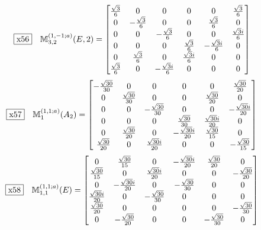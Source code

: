 \documentclass[fleqn,10pt,landscape]{jsarticle}
\begin{document}
\begin{dmath*}
\fbox{x56}\quad \mathbb{M}_{3,2}^{(1,-1;a)}(E,2)=\begin{bmatrix} \frac{\sqrt{3}}{6} & 0 & 0 & 0 & 0 & \frac{\sqrt{3}}{6} \\ 0 & - \frac{\sqrt{3}}{6} & 0 & 0 & \frac{\sqrt{3}}{6} & 0 \\ 0 & 0 & - \frac{\sqrt{3}}{6} & 0 & 0 & \frac{\sqrt{3} i}{6} \\ 0 & 0 & 0 & \frac{\sqrt{3}}{6} & - \frac{\sqrt{3} i}{6} & 0 \\ 0 & \frac{\sqrt{3}}{6} & 0 & \frac{\sqrt{3} i}{6} & 0 & 0 \\ \frac{\sqrt{3}}{6} & 0 & - \frac{\sqrt{3} i}{6} & 0 & 0 & 0 \end{bmatrix}
\end{dmath*}
\begin{dmath*}
\fbox{x57}\quad \mathbb{M}_{1}^{(1,1;a)}(A_{2})=\begin{bmatrix} - \frac{\sqrt{30}}{30} & 0 & 0 & 0 & 0 & \frac{\sqrt{30}}{20} \\ 0 & \frac{\sqrt{30}}{30} & 0 & 0 & \frac{\sqrt{30}}{20} & 0 \\ 0 & 0 & - \frac{\sqrt{30}}{30} & 0 & 0 & - \frac{\sqrt{30} i}{20} \\ 0 & 0 & 0 & \frac{\sqrt{30}}{30} & \frac{\sqrt{30} i}{20} & 0 \\ 0 & \frac{\sqrt{30}}{20} & 0 & - \frac{\sqrt{30} i}{20} & \frac{\sqrt{30}}{15} & 0 \\ \frac{\sqrt{30}}{20} & 0 & \frac{\sqrt{30} i}{20} & 0 & 0 & - \frac{\sqrt{30}}{15} \end{bmatrix}
\end{dmath*}
\begin{dmath*}
\fbox{x58}\quad \mathbb{M}_{1,1}^{(1,1;a)}(E)=\begin{bmatrix} 0 & \frac{\sqrt{30}}{15} & 0 & - \frac{\sqrt{30} i}{20} & \frac{\sqrt{30}}{20} & 0 \\ \frac{\sqrt{30}}{15} & 0 & \frac{\sqrt{30} i}{20} & 0 & 0 & - \frac{\sqrt{30}}{20} \\ 0 & - \frac{\sqrt{30} i}{20} & 0 & - \frac{\sqrt{30}}{30} & 0 & 0 \\ \frac{\sqrt{30} i}{20} & 0 & - \frac{\sqrt{30}}{30} & 0 & 0 & 0 \\ \frac{\sqrt{30}}{20} & 0 & 0 & 0 & 0 & - \frac{\sqrt{30}}{30} \\ 0 & - \frac{\sqrt{30}}{20} & 0 & 0 & - \frac{\sqrt{30}}{30} & 0 \end{bmatrix}
\end{dmath*}
\end{document}
